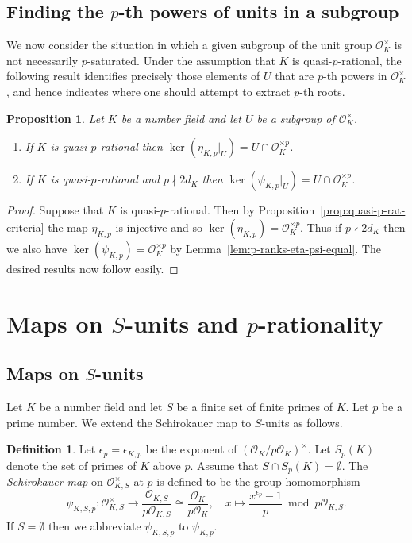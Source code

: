 \documentclass[12pt, a4paper, usenames]{amsart}
\theoremstyle{plain}
\newtheorem{prop}[theorem]{Proposition}
\theoremstyle{remark}
\theoremstyle{definition}
\newtheorem{definition}[theorem]{Definition}
\begin{document}
\subsection{Finding the $p$-th powers of units in a subgroup}
We now consider the situation in which a given subgroup of the unit group $\mathcal{O}_{K}^{\times}$ is not necessarily $p$-saturated. 
Under the assumption that $K$ is quasi-$p$-rational, 
the following result identifies precisely those elements of $U$ that are $p$-th powers in $\mathcal{O}_{K}^{\times}$, and hence indicates where one should attempt to extract $p$-th roots.

\begin{prop}\label{prop:ker-subgroup-of-units}
Let $K$ be a number field and let $U$ be a subgroup of $\mathcal{O}_{K}^{\times}$.
\begin{enumerate}
    \item If $K$ is quasi-$p$-rational then
    $\ker(\eta_{K,p} \vert_{U}) = U \cap \mathcal{O}_{K}^{\times p}$.
    \item If $K$ is quasi-$p$-rational and $p \nmid 2d_{K}$ then $\ker(\psi_{K,p} \vert_{U}) = U \cap \mathcal{O}_{K}^{\times p}$. 
\end{enumerate}
\end{prop}

\begin{proof}
Suppose that $K$ is quasi-$p$-rational. 
Then by Proposition~\ref{prop:quasi-p-rat-criteria} the map $\overline{\eta}_{K,p}$ 
is injective and so $\ker(\eta_{K,p})=\mathcal{O}_{K}^{\times p}$.
Thus if $p \nmid 2d_{K}$ then we also have
$\ker(\psi_{K,p})=\mathcal{O}_{K}^{\times p}$ by Lemma~\ref{lem:p-ranks-eta-psi-equal}.
The desired results now follow easily. 
\end{proof}


\section{Maps on $S$-units and $p$-rationality}\label{sec:maps-on-S-units-p-rat}


\subsection{Maps on $S$-units}\label{subsec:maps-on-S-units}
Let $K$ be a number field and let $S$ be a finite set of finite primes of $K$.
Let $p$ be a prime number. 
We extend the Schirokauer map to $S$-units as follows.

\begin{definition}\label{def:Schirokauer-S-units}
Let  $\epsilon_{p}=\epsilon_{K,p}$ be the exponent of $(\mathcal{O}_{K}/p\mathcal{O}_{K})^{\times}$.
Let $S_{p}(K)$ denote the set of primes of $K$ above $p$.
Assume that $S \cap S_{p}(K) = \emptyset$.
The \textit{Schirokauer map} on $\mathcal{O}_{K,S}^{\times}$ at $p$
is defined to be the group homomorphism
\[
\psi_{K,S,p} \colon \mathcal{O}_{K,S}^\times \longrightarrow 
\frac{\mathcal{O}_{K,S}}{p\mathcal{O}_{K,S}} \cong \frac{\mathcal{O}_{K}}{p\mathcal{O}_{K}}, 
\quad
x \mapsto
\frac{x^{\epsilon_{p}} - 1}{p} \bmod p\mathcal{O}_{K,S}.
\]
If $S=\emptyset$ then we abbreviate $\psi_{K,S,p}$ to $\psi_{K,p}$.
\end{definition}
\end{document}
